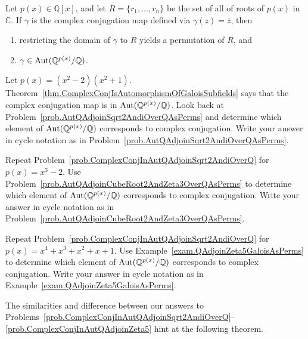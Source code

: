 \begin{theorem}\label{thm.ComplexConjIsAutomorphismOfGaloisSubfields}
Let $p(x) \in \mathbb{Q}[x]$, and let $R=\{r_1,\ldots,r_n\}$ be the set of all of roots of $p(x)$ in $\mathbb{C}$. If $\gamma$ is the complex conjugation map defined via $\gamma(z) = \overline{z}$, then 
\begin{enumerate}
\item restricting the domain of $\gamma$ to $R$ yields a permutation of $R$, and 
\item $\gamma \in \operatorname{Aut}(\mathbb{Q}^{p(x)}/\mathbb{Q})$.
\end{enumerate}
\end{theorem}

\begin{problem}\label{prob.ComplexConjInAutQAdjoinSqrt2AndiOverQ}
Let $p(x) = (x^2-2)(x^2+1)$. Theorem~\ref{thm.ComplexConjIsAutomorphismOfGaloisSubfields} says that the complex conjugation map is in $\operatorname{Aut}(\mathbb{Q}^{p(x)}/\mathbb{Q})$. Look back at Problem~\ref{prob.AutQAdjoinSqrt2AndiOverQAsPerms} and determine which element of $\operatorname{Aut}(\mathbb{Q}^{p(x)}/\mathbb{Q})$ corresponds to complex conjugation. Write your answer in cycle notation as in Problem~\ref{prob.AutQAdjoinSqrt2AndiOverQAsPerms}.
\end{problem}

\begin{problem}\label{prob.ComplexConjInAutQAdjoinCubeRoot2AndZeta3OverQ}
Repeat Problem~\ref{prob.ComplexConjInAutQAdjoinSqrt2AndiOverQ} for $p(x) = x^3-2$. Use Problem~\ref{prob.AutQAdjoinCubeRoot2AndZeta3OverQAsPerms} to determine which element of $\operatorname{Aut}(\mathbb{Q}^{p(x)}/\mathbb{Q})$ corresponds to complex conjugation.  Write your answer in cycle notation as in Problem~\ref{prob.AutQAdjoinCubeRoot2AndZeta3OverQAsPerms}.
\end{problem}

\begin{problem}\label{prob.ComplexConjInAutQAdjoinZeta5}
Repeat Problem~\ref{prob.ComplexConjInAutQAdjoinSqrt2AndiOverQ} for $p(x) = x^4+x^3+x^2+x+1$. Use Example~\ref{exam.QAdjoinZeta5GaloisAsPerms} to determine which element of $\operatorname{Aut}(\mathbb{Q}^{p(x)}/\mathbb{Q})$ corresponds to complex conjugation. Write your answer in cycle notation as in Example~\ref{exam.QAdjoinZeta5GaloisAsPerms}.
\end{problem}

The similarities and difference between our answers to Problems~\ref{prob.ComplexConjInAutQAdjoinSqrt2AndiOverQ}--\ref{prob.ComplexConjInAutQAdjoinZeta5}  hint at the following theorem.

